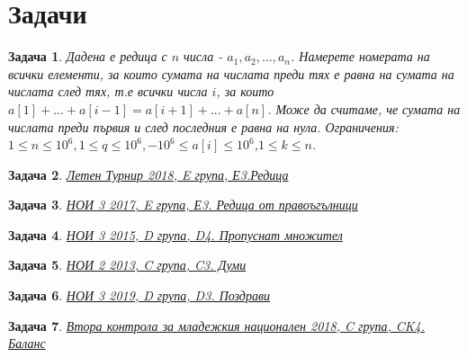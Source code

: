 \documentclass[]{article}
\newtheorem{problem}{Задача}
\begin{document}
\section{Задачи}

\begin{problem}
Дадена е редица с $n$ числа - $a_1,a_2,...,a_n$. Намерете номерата на всички елементи, за които сумата на числата преди тях е равна на сумата на числата след тях, т.е всички числа $i$, за които $a[1]+...+a[i-1]=a[i+1]+...+a[n]$. Може да считаме, че сумата на числата преди първия и след последния е равна на нула.\newline
Ограничения: $1\leq n\leq 10^6,1\leq q\leq 10^6,-10^6 \leq a[i]\leq 10^6$,$1\leq k\leq n$.
\end{problem}

\begin{problem}
\href{https://arena.olimpiici.com/#/catalog/87/problem/198}{Летен Турнир 2018, E група, Е3.Редица}
\end{problem}

\begin{problem}
\href{https://arena.olimpiici.com/#/catalog/251/problem/709}{НОИ 3 2017, E група, Е3. Редица от правоъгълници}
\end{problem}

\begin{problem}
\href{https://arena.olimpiici.com/#/catalog/241/problem/662}{НОИ 3 2015, D група, D4. Пропуснат множител}
\end{problem}

\begin{problem}
\href{https://arena.olimpiici.com/#/catalog/175/problem/417}{НОИ 2 2013, C група, C3. Думи}
\end{problem}

\begin{problem}
\href{https://arena.olimpiici.com/#/catalog/407/problem/1108}{НОИ 3 2019, D група, D3. Поздрави}
\end{problem}

\begin{problem}
\href{https://arena.olimpiici.com/api/public/problems/1142/pdf}{Втора контрола за младежкия национален 2018, C група, CK4. Баланс}
\end{problem}
\end{document}
